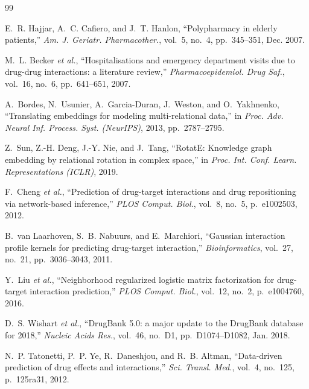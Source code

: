 \documentclass[12pt,a4paper,oneside]{report}
\begin{document}
\newpage
\begin{thebibliography}{99}

E.~R. Hajjar, A.~C. Cafiero, and J.~T. Hanlon,
``Polypharmacy in elderly patients,''
\textit{Am. J. Geriatr. Pharmacother.}, vol.~5, no.~4,
pp.~345--351, Dec. 2007.

M.~L. Becker \textit{et al.},
``Hospitalisations and emergency department visits due to drug-drug interactions:
a literature review,''
\textit{Pharmacoepidemiol. Drug Saf.}, vol.~16, no.~6, pp.~641--651, 2007.

A.~Bordes, N.~Usunier, A.~Garcia-Duran, J.~Weston, and O.~Yakhnenko,
``Translating embeddings for modeling multi-relational data,''
in \textit{Proc. Adv. Neural Inf. Process. Syst. (NeurIPS)}, 2013,
pp.~2787--2795.

Z.~Sun, Z.-H. Deng, J.-Y. Nie, and J.~Tang,
``RotatE: Knowledge graph embedding by relational rotation in complex space,''
in \textit{Proc. Int. Conf. Learn. Representations (ICLR)}, 2019.

F.~Cheng \textit{et al.},
``Prediction of drug-target interactions and drug repositioning via network-based
inference,''
\textit{PLOS Comput. Biol.}, vol.~8, no.~5, p.~e1002503, 2012.

B.~van Laarhoven, S.~B. Nabuurs, and E.~Marchiori,
``Gaussian interaction profile kernels for predicting drug-target interaction,''
\textit{Bioinformatics}, vol.~27, no.~21, pp.~3036--3043, 2011.

Y.~Liu \textit{et al.},
``Neighborhood regularized logistic matrix factorization for drug-target interaction
prediction,''
\textit{PLOS Comput. Biol.}, vol.~12, no.~2, p.~e1004760, 2016.

D.~S. Wishart \textit{et al.},
``DrugBank 5.0: a major update to the DrugBank database for 2018,''
\textit{Nucleic Acids Res.}, vol.~46, no.~D1, pp.~D1074--D1082, Jan. 2018.

N.~P. Tatonetti, P.~P. Ye, R.~Daneshjou, and R.~B. Altman,
``Data-driven prediction of drug effects and interactions,''
\textit{Sci. Transl. Med.}, vol.~4, no.~125, p.~125ra31, 2012.


\end{thebibliography}
\end{document}
